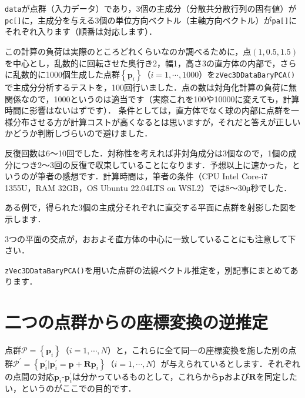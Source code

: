 ﻿\documentclass[a4paper]{jsarticle}
\begin{document}
\verb|data|が点群（入力データ）であり，3個の主成分（分散共分散行列の固有値）が\verb|pc[]|に，主成分を与える3個の単位方向ベクトル（主軸方向ベクトル）が\verb|pa[]|にそれぞれ入ります（順番は対応します）．

この計算の負荷は実際のところどれくらいなのか調べるために，点$(1,0.5,1.5)$を中心とし，乱数的に回転させた奥行き2，幅1，高さ3の直方体の内部で，さらに乱数的に1000個生成した点群$\left\{\boldsymbol{p}_{i}\right\}$（$i=1,\cdots,1000$）を\verb|zVec3DDataBaryPCA()|で主成分分析するテストを，100回行いました．点の数は対角化計算の負荷に無関係なので，1000というのは適当です（実際これを100や10000に変えても，計算時間に影響はないはずです）．
条件としては，直方体でなく球の内部に点群を一様分布させる方が計算コストが高くなるとは思いますが，それだと答えが正しいかどうか判断しづらいので避けました．

反復回数は6〜10回でした．対称性を考えれば非対角成分は3個なので，1個の成分につき2〜3回の反復で収束していることになります．予想以上に速かった，というのが筆者の感想です．計算時間は，筆者の条件（CPU Intel Core-i7 1355U，RAM 32GB，OS Ubuntu 22.04LTS on WSL2）では8〜30μ秒でした．

ある例で，得られた3個の主成分それぞれに直交する平面に点群を射影した図を示します．

\begin{figure*}[h]
\centering

\end{figure*}

3つの平面の交点が，おおよそ直方体の中心に一致していることにも注意して下さい．

\verb|zVec3DDataBaryPCA()|を用いた点群の法線ベクトル推定を，別記事にまとめてあります．


\section{二つの点群からの座標変換の逆推定}

点群$\mathcal{P}=\left\{\boldsymbol{p}_{i}\right\}$（$i=1,\cdots,N$）と，これらに全て同一の座標変換を施した別の点群$\mathcal{P}^{\prime}=\left\{\boldsymbol{p}_{i}^{\prime}|\boldsymbol{p}_{i}^{\prime}=\boldsymbol{p}+\boldsymbol{R}\boldsymbol{p}_{i}\right\}$（$i=1,\cdots,N$）が与えられているとします．それぞれの点間の対応$\boldsymbol{p}_{i}$-$\boldsymbol{p}_{i}^{\prime}$は分かっているものとして，これらから$\boldsymbol{p}$および$\boldsymbol{R}$を同定したい，というのがここでの目的です．
\end{document}
